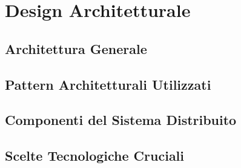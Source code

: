 \chapter{Design Architetturale}

\section{Architettura Generale}
\section{Pattern Architetturali Utilizzati}
\section{Componenti del Sistema Distribuito}
\section{Scelte Tecnologiche Cruciali}

